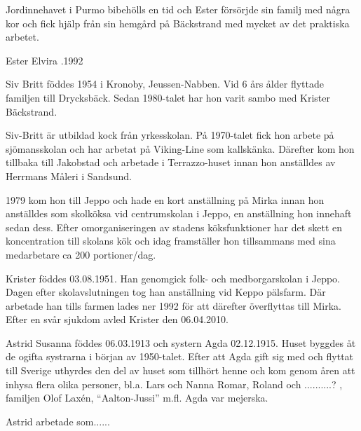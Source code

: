 Jordinnehavet i Purmo bibehölls en tid och Ester försörjde sin familj med några kor och fick hjälp från sin hemgård på Bäckstrand med mycket av det praktiska arbetet.

Ester Elvira .1992






Siv Britt föddes 1954 i Kronoby, Jeussen-Nabben. Vid 6 års ålder flyttade familjen till Drycksbäck. Sedan 1980-talet har hon varit sambo med Krister Bäckstrand.

Siv-Britt är utbildad kock från yrkesskolan. På 1970-talet fick hon arbete på sjömansskolan och  har arbetat på Viking-Line som kallskänka. Därefter kom hon tillbaka till Jakobstad och arbetade i Terrazzo-huset innan hon anställdes av Herrmans Måleri i Sandsund.

1979 kom hon till Jeppo och hade en kort anställning på Mirka innan hon anställdes som skolköksa vid centrumskolan i Jeppo, en anställning hon innehaft sedan dess. Efter omorganiseringen av stadens köksfunktioner har det skett en koncentration till skolans kök och idag framställer hon tillsammans med sina medarbetare ca 200 portioner/dag.


Krister föddes 03.08.1951. Han genomgick folk- och medborgarskolan i Jeppo. Dagen efter skolavslutningen tog han anställning vid Keppo pälsfarm. Där arbetade han tills farmen lades ner 1992 för att därefter överflyttas till Mirka. Efter en svår sjukdom avled Krister den 06.04.2010.


Astrid Susanna föddes 06.03.1913 och systern Agda 02.12.1915. Huset byggdes åt de ogifta systrarna i början av 1950-talet. Efter att Agda gift sig med  och flyttat till Sverige uthyrdes den del av huset som tillhört henne och kom genom åren att inhysa flera olika personer, bl.a. Lars och Nanna Romar, Roland och ..........? , familjen Olof Laxén,  ``Aalton-Jussi'' m.fl.
Agda var mejerska.

Astrid arbetade som......
\begin{jhchildren}
  \item {}
\end{jhchildren}

